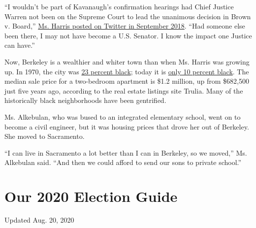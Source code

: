 ``I wouldn't be part of Kavanaugh's confirmation hearings had Chief
Justice Warren not been on the Supreme Court to lead the unanimous
decision in Brown v. Board,''
\href{https://twitter.com/kamalaharris/status/1038952698438197250?lang=en}{Ms.
Harris posted on Twitter in September 2018}. ``Had someone else been
there, I may not have become a U.S. Senator. I know the impact one
Justice can have.''

Now, Berkeley is a wealthier and whiter town than when Ms. Harris was
growing up. In 1970, the city was
\href{http://www.bayareacensus.ca.gov/cities/Berkeley70.htm}{23 percent
black}; today it is
\href{http://www.bayareacensus.ca.gov/cities/Berkeley.htm}{only 10
percent black}. The median sale price for a two-bedroom apartment is
\$1.2 million, up from \$682,500 just five years ago, according to the
real estate listings site Trulia. Many of the historically black
neighborhoods have been gentrified.

Ms. Alkebulan, who was bused to an integrated elementary school, went on
to become a civil engineer, but it was housing prices that drove her out
of Berkeley. She moved to Sacramento.

``I can live in Sacramento a lot better than I can in Berkeley, so we
moved,'' Ms. Alkebulan said. ``And then we could afford to send our sons
to private school.''

\hypertarget{our-2020-election-guide}{%
\section{Our 2020 Election Guide}\label{our-2020-election-guide}}

Updated Aug. 20, 2020


